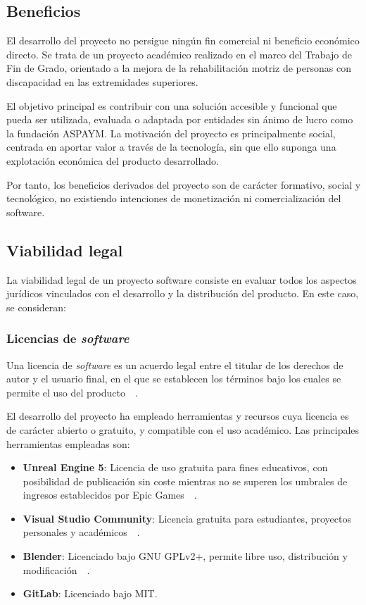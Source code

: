 \subsection*{Beneficios}

El desarrollo del proyecto no persigue ningún fin comercial ni beneficio económico directo. Se trata de un proyecto académico realizado en el marco del Trabajo de Fin de Grado, orientado a la mejora de la rehabilitación motriz de personas con discapacidad en las extremidades superiores.

El objetivo principal es contribuir con una solución accesible y funcional que pueda ser utilizada, evaluada o adaptada por entidades sin ánimo de lucro como la fundación ASPAYM. La motivación del proyecto es principalmente social, centrada en aportar valor a través de la tecnología, sin que ello suponga una explotación económica del producto desarrollado.

Por tanto, los beneficios derivados del proyecto son de carácter formativo, social y tecnológico, no existiendo intenciones de monetización ni comercialización del software.


\subsection{Viabilidad legal}
La viabilidad legal de un proyecto software consiste en evaluar todos los aspectos jurídicos vinculados con el desarrollo y la distribución del producto. En este caso, se consideran:

\subsubsection{Licencias de \textit{software}}

Una licencia de \textit{software} es un acuerdo legal entre el titular de los derechos de autor y el usuario final, en el que se establecen los términos bajo los cuales se permite el uso del producto~~\cite{licenciaQueEs}.

El desarrollo del proyecto ha empleado herramientas y recursos cuya licencia es de carácter abierto o gratuito, y compatible con el uso académico. Las principales herramientas empleadas son:

\begin{itemize}
  \item \textbf{Unreal Engine 5}: Licencia de uso gratuita para fines educativos, con posibilidad de publicación sin coste mientras no se superen los umbrales de ingresos establecidos por Epic Games~~\cite{unrealLicense}.
  \item \textbf{Visual Studio Community}: Licencia gratuita para estudiantes, proyectos personales y académicos~~\cite{vslicense}.
  \item \textbf{Blender}: Licenciado bajo GNU GPLv2+, permite libre uso, distribución y modificación~~\cite{blenderlicense}.
  \item \textbf{GitLab}: Licenciado bajo MIT.
\end{itemize}

